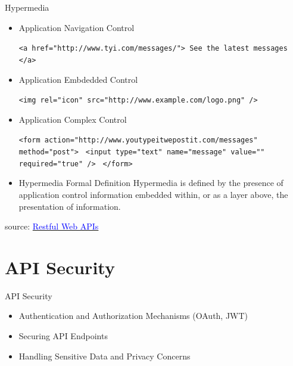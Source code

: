 \documentclass{beamer}
\newcommand{\code}[1]{\colorbox{codegray}{\texttt{#1}}}
\begin{document}
\begin{frame}[t, fragile]{Hypermedia}
		\begin{itemize}
			\item<1-> Application Navigation Control \\
			\scriptsize		
				\begin{semiverbatim}
					\code{<a href="http://www.tyi.com/messages/"> See the latest messages </a>}	
				\end{semiverbatim}
			
			\item<2-> Application Embdedded Control
			\scriptsize		
				\begin{semiverbatim}
					\code{<img rel="icon" src="http://www.example.com/logo.png" />}
				\end{semiverbatim}
			
			\item<3-> Application Complex Control \\
			\scriptsize			
				\begin{semiverbatim}
					\code{<form action="http://www.youtypeitwepostit.com/messages" method="post">}
					\code{	<input type="text" name="message" value="" required="true" /> }
					\code{</form>}
				\end{semiverbatim}
				
			\item<4->[] 
			\scriptsize		
			\begin{block}{Hypermedia Formal Definition}
				Hypermedia is defined by the presence of application control information embedded within, or as a layer above, the presentation of information.
			\end{block}	
		\end{itemize}		

\tiny source: \href{https://www.oreilly.com/library/view/restful-web-apis/9781449359713/} {\textcolor{blue}{Restful Web APIs}} 	
\end{frame}
				


\section{API Security}
\begin{frame}{API Security}
  \begin{itemize}
    \item Authentication and Authorization Mechanisms (OAuth, JWT)
    \item Securing API Endpoints
    \item Handling Sensitive Data and Privacy Concerns
  \end{itemize}
\end{frame}
\end{document}
